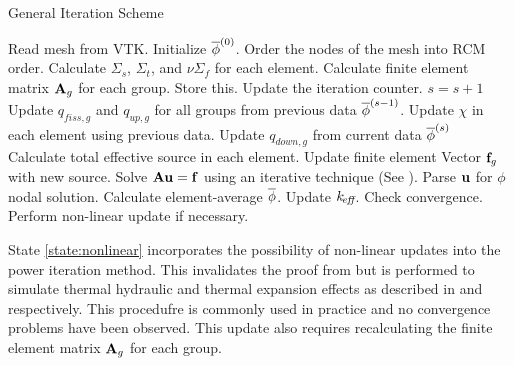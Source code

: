     \begin{algorithm}
      \caption{General Iteration Scheme}
      \label{algorithm:general}
      \begin{algorithmic}[1]
      \State Read mesh from VTK.
      \State Initialize $\overline{\phi}^{(0)}$.
      \State Order the nodes of the mesh into RCM order.
        \label{state:rcm}
      \State Calculate $\Sigma_s$, $\Sigma_t$, and $\nu \Sigma_f$ for each 
        element.
      \State Calculate finite element matrix $\mathbf{A}_g$ for each group. Store this. 
        \label{state:fem_matrix}
        \State Update the iteration counter. $s=s+1$
        \State Update $q_{fiss,g}$ and $q_{up,g}$ for all groups from previous 
          data $\overline{\phi}^{(s-1)}$.
        \State Update $\chi$ in each element using previous data.
          \label{state:chi_collapse}
          \State Update $q_{down,g}$ from current data $\overline{\phi}^{(s)}$
          \State Calculate total effective source in each element.
          \State Update finite element Vector $\mathbf{f}_g$ with new source.
            \label{state:fem_vector}
          \State Solve $\mathbf{A} \mathbf{u} = \mathbf{f}$ using an iterative technique (See
            ).
          \State Parse $\mathbf{u}$ for $\phi$ nodal solution.
          \State Calculate element-average $\overline{\phi}$.
        \EndFor
        \State Update $k_{\!\mbox{\scriptsize \em eff}}$.
        \State Check convergence.
        \State Perform non-linear update if necessary. \label{state:nonlinear}
      \EndWhile
      \end{algorithmic}
    \end{algorithm}

    State \ref{state:nonlinear} incorporates the possibility of non-linear
    updates into the power iteration method. This invalidates the proof from
     but is performed to simulate thermal hydraulic
    and thermal expansion effects as described in 
    and  respectively. This procedufre is commonly
    used in practice and no convergence problems have been observed. This update
    also requires recalculating the finite element matrix $\mathbf{A}_g$ for each 
    group.


